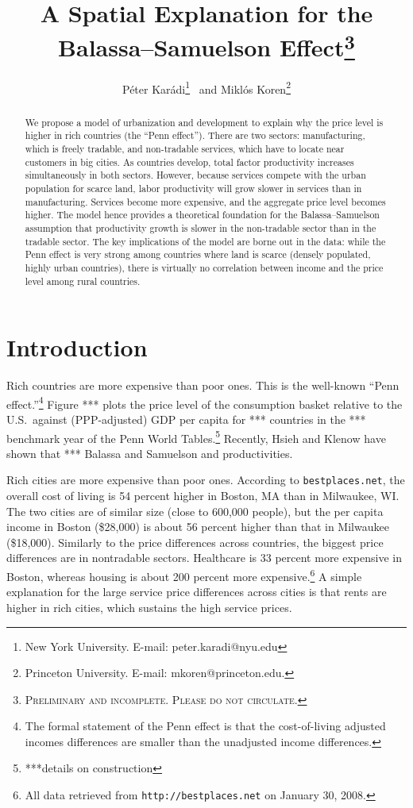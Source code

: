 \documentclass[12pt]{article}
\begin{document}
\title{A Spatial Explanation for the Balassa--Samuelson Effect\thanks{\textsc{Preliminary and incomplete. Please do not circulate.}}}
\author{P\'eter Kar\'adi\thanks{New York University. E-mail: peter.karadi@nyu.edu}~ and Mikl\'os Koren\thanks{Princeton University. E-mail: mkoren@princeton.edu.}}
\maketitle

\begin{abstract}
We propose a model of urbanization and development to explain why the price level is higher in rich countries (the ``Penn effect''). There are two sectors: manufacturing, which is freely tradable, and non-tradable services, which have to locate near customers in big cities. As countries develop, total factor productivity increases simultaneously in both sectors. However, because services compete with the urban population for scarce land, labor productivity will grow slower in services than in manufacturing. Services become more expensive, and the aggregate price level becomes higher. The model hence provides a theoretical foundation for the Balassa--Samuelson assumption that productivity growth is slower in the non-tradable sector than in the tradable sector. The key implications of the model are borne out in the data: while the Penn effect is very strong among countries where land is scarce (densely populated, highly urban countries), there is virtually no correlation between income and the price level among rural countries.
\end{abstract}

\section{Introduction}
Rich countries are more expensive than poor ones. This is the well-known ``Penn effect.''\footnote{The formal statement of the Penn effect is that the cost-of-living adjusted incomes differences are smaller than the unadjusted income differences.} Figure *** plots the price level of the consumption basket relative to the U.S.~against (PPP-adjusted) GDP per capita for *** countries in the *** benchmark year of the Penn World Tables.\footnote{***details on construction} Recently, Hsieh and Klenow have shown that *** Balassa and Samuelson and productivities.

Rich cities are more expensive than poor ones. According to \texttt{bestplaces.net}, the overall cost of living is 54 percent higher in Boston, MA than in Milwaukee, WI. The two cities are of similar size (close to 600,000 people), but the per capita income in Boston (\$28,000) is about 56 percent higher than that in Milwaukee (\$18,000). Similarly to the price differences across countries, the biggest price differences are in nontradable sectors. Healthcare is 33 percent more expensive in Boston, whereas housing is about 200 percent more expensive.\footnote{All data retrieved from \texttt{http://bestplaces.net} on January 30, 2008.} A simple explanation for the large service price differences across cities is that rents are higher in rich cities, which sustains the high service prices.
\end{document}
